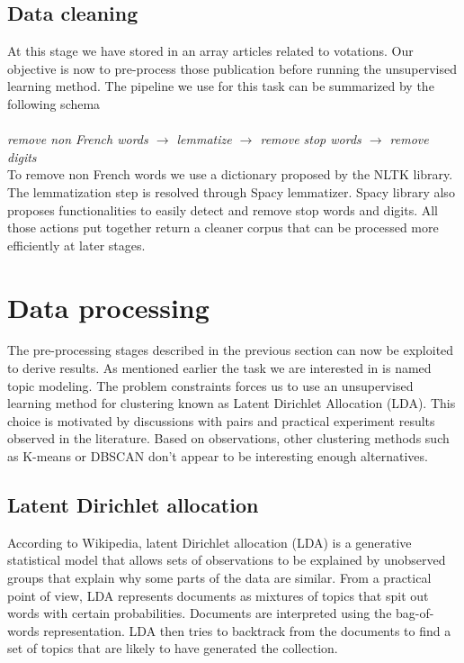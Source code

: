 \documentclass[11pt]{article}
\begin{document}
\subsection{Data cleaning}

At this stage we have stored in an array articles related to votations. Our objective is now to pre-process those publication before running the unsupervised learning method. The pipeline we use for this task can be summarized by the following schema
\\
\\
\textit{remove non French words $\rightarrow$ lemmatize $\rightarrow$ remove stop words $\rightarrow$ remove digits}
\\

To remove non French words we use a dictionary proposed by the NLTK library. The lemmatization step is resolved through Spacy lemmatizer. Spacy library also proposes functionalities to easily detect and remove stop words and digits. All those actions put together return a cleaner corpus that can be processed more efficiently at later stages.

\section{Data processing}

The pre-processing stages described in the previous section can now be exploited to derive results. As mentioned earlier the task we are interested in is named topic modeling. The problem constraints forces us to use an unsupervised learning method for clustering known as Latent Dirichlet Allocation (LDA). This choice is motivated by discussions with pairs and practical experiment results observed in the literature.
Based on observations, other clustering methods such as K-means or DBSCAN don't appear to be interesting enough alternatives. 

\subsection{Latent Dirichlet allocation}

According to Wikipedia, latent Dirichlet allocation (LDA) is a generative statistical model that allows sets of observations to be explained by unobserved groups that explain why some parts of the data are similar. 
From a practical point of view, LDA represents documents as mixtures of topics that spit out words with certain probabilities. Documents are interpreted using the bag-of-words representation. LDA then tries to backtrack from the documents to find a set of topics that are likely to have generated the collection.
\end{document}
